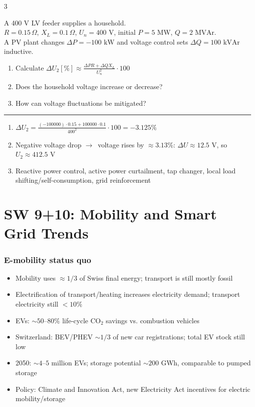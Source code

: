 \documentclass[9pt, landscape, a4paper]{article}
\let\mathto\to
\renewcommand{\to}{\ensuremath{\mathto}\ }
\newcommand{\hr}{\vspace{0.1cm}\par\vspace{-.5\ht\strutbox}\noindent\rule{\linewidth}{.5pt}\par\vspace{0.1cm}}
\begin{document}
\begin{multicols*}{3}
\begin{exercisebox}
  A 400 V LV feeder supplies a household.\\
  $R=0.15\,\Omega$, $X_L=0.1\,\Omega$, $U_n=400\text{ V}$, initial $P=5\text{ MW}$, $Q=2\text{ MVAr}$.\\
  A PV plant changes $\Delta P=-100\text{ kW}$ and voltage control sets $\Delta Q=100\text{ kVAr}$ inductive.
  \begin{enumerate}[label=\arabic*.]
    \item Calculate $\Delta U_2[\%] \approx \frac{\Delta P R + \Delta Q X_L}{U_n^2}\cdot100$
    \item Does the household voltage increase or decrease?
    \item How can voltage fluctuations be mitigated?
  \end{enumerate}
  \hr
  \begin{enumerate}[label=\arabic*.]
    \item $\Delta U_2 = \frac{(-100000)\cdot0.15 + 100000\cdot0.1}{400^2}\cdot100
      = -3.125\%$
    \item Negative voltage drop \to voltage rises by $\approx 3.13\%$:
      $\Delta U \approx 12.5\text{ V}$, so $U_2 \approx 412.5\text{ V}$
    \item Reactive power control, active power curtailment, tap changer, local load shifting/self-consumption,
      grid reinforcement
  \end{enumerate}
\end{exercisebox}

\part{SW 9+10: Mobility and Smart Grid Trends}

\section{E-mobility status quo}
\begin{itemize}
  \item Mobility uses $\approx 1/3$ of Swiss final energy; transport is still mostly fossil
  \item Electrification of transport/heating increases electricity demand; transport electricity still $<10\%$
  \item EVs: $\sim 50$--$80\%$ life-cycle CO$_2$ savings vs. combustion vehicles
  \item Switzerland: BEV/PHEV $\sim 1/3$ of new car registrations; total EV stock still low
  \item 2050: $\sim 4$--$5$ million EVs; storage potential $\sim 200$ GWh, comparable to pumped storage
  \item Policy: Climate and Innovation Act, new Electricity Act incentives for electric mobility/storage
\end{itemize}


\end{multicols*}
\end{document}

